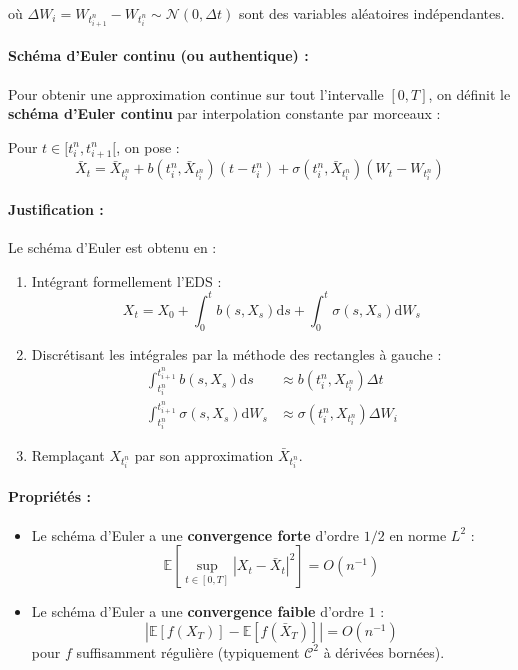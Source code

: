 \documentclass[12pt,a4paper]{article}
\theoremstyle{definition}
\theoremstyle{remark}
\newcommand{\E}{\mathbb{E}}
\newcommand{\dd}{\mathrm{d}}
\newcommand{\supt}[1]{\sup_{t \in #1}}
\begin{document}
où $\Delta W_i = W_{t_{i+1}^n} - W_{t_i^n} \sim \mathcal{N}(0, \Delta t)$ sont des variables aléatoires indépendantes.

\paragraph{Schéma d'Euler continu (ou authentique) :}
Pour obtenir une approximation continue sur tout l'intervalle $[0,T]$, on définit le \textbf{schéma d'Euler continu} par interpolation constante par morceaux :

Pour $t \in [t_i^n, t_{i+1}^n[$, on pose :
\begin{equation}
\bar{X}_t = \bar{X}_{t_i^n} + b(t_i^n, \bar{X}_{t_i^n})(t - t_i^n) + \sigma(t_i^n, \bar{X}_{t_i^n})(W_t - W_{t_i^n})
\end{equation}

\paragraph{Justification :}
Le schéma d'Euler est obtenu en :
\begin{enumerate}
\item Intégrant formellement l'EDS :
\[
X_t = X_0 + \int_0^t b(s, X_s)\dd s + \int_0^t \sigma(s, X_s)\dd W_s
\]

\item Discrétisant les intégrales par la méthode des rectangles à gauche :
\begin{align*}
\int_{t_i^n}^{t_{i+1}^n} b(s, X_s)\dd s &\approx b(t_i^n, X_{t_i^n})\Delta t \\
\int_{t_i^n}^{t_{i+1}^n} \sigma(s, X_s)\dd W_s &\approx \sigma(t_i^n, X_{t_i^n})\Delta W_i
\end{align*}

\item Remplaçant $X_{t_i^n}$ par son approximation $\bar{X}_{t_i^n}$.
\end{enumerate}

\paragraph{Propriétés :}
\begin{itemize}
\item Le schéma d'Euler a une \textbf{convergence forte} d'ordre $1/2$ en norme $L^2$ :
\[
\E\left[\supt{[0,T]} |X_t - \bar{X}_t|^2\right] = O(n^{-1})
\]

\item Le schéma d'Euler a une \textbf{convergence faible} d'ordre $1$ :
\[
|\E[f(X_T)] - \E[f(\bar{X}_T)]| = O(n^{-1})
\]
pour $f$ suffisamment régulière (typiquement $\mathcal{C}^2$ à dérivées bornées).
\end{itemize}
\end{document}
